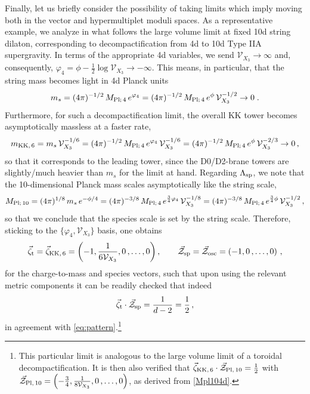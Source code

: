 Finally, let us briefly consider the possibility of taking limits which imply moving both in the vector and hypermultiplet moduli spaces. As a representative example, we analyze in what follows the large volume limit at fixed 10d string dilaton, corresponding to decompactification from 4d to 10d Type IIA supergravity. In terms of the appropriate 4d variables, we send $\mathcal{V}_{X_3}\to\infty$ and, consequently, $\varphi_4=\phi-\frac{1}{2}\log\mathcal{V}_{X_3} \to -\infty$. This means, in particular, that the string mass becomes light in 4d Planck units
%
\begin{equation}
	m_s = (4\pi)^{-1/2}\, M_{\rm Pl;\, 4}\, e^{\varphi_4} =  (4\pi)^{-1/2}\, M_{\rm Pl;\, 4}\, e^{\phi}\, \mathcal{V}_{X_3}^{-1/2}\to 0\;.
\end{equation}
%
Furthermore, for such a decompactification limit, the overall KK tower becomes asymptotically massless at a faster rate,
%
\begin{equation}
	m_{\rm KK,\, 6} = m_s\, \mathcal{V}_{X_3}^{-1/6}= (4\pi)^{-1/2}\, M_{\rm Pl;\, 4}\, e^{\varphi_4} \,\mathcal{V}_{X_3}^{-1/6} = (4\pi)^{-1/2}\, M_{\rm Pl;\, 4}\, e^{\phi}\, \mathcal{V}_{X_3}^{-2/3}\to 0\,,
\end{equation}
%
so that it corresponds to the leading tower, since the D0/D2-brane towers are slightly/much heavier than $m_{s}$ for the limit at hand. Regarding $\Lambda_{\text{sp}}$, we note that the 10-dimensional Planck mass scales asymptotically like the string scale,%
%
\begin{equation}
	M_{\rm Pl;\, 10} = (4\pi)^{1/8}\, m_s\, e^{-\phi/4} = (4\pi)^{-3/8}\, M_{\rm Pl;\, 4}\, e^{\frac{3}{4}\varphi_4}\, \mathcal{V}_{X_3}^{-1/8} = (4\pi)^{-3/8}\, M_{\rm Pl;\, 4}\, e^{\frac{3}{4}\phi}\, \mathcal{V}_{X_3}^{-1/2}\, ,
\label{Mpl104d}
\end{equation}
%
so that we conclude that the species scale is set by the string scale. Therefore, sticking to the $\{\varphi_4,\mathcal{V}_{X_3}\}$ basis, one obtains
%
\begin{equation}
	\vec{\zeta}_{\rm t}=\vec{\zeta}_{\rm KK,\, 6}=\left(-1,\frac{1}{6\mathcal{V}_{X_3}}, 0\, , \ldots, 0\right),\qquad \vec{\mathcal{Z}}_{\rm sp}=\vec{\mathcal{Z}}_{\rm osc}= \left(-1, 0\, , \ldots, 0\right)\, ,
\end{equation}
%
for the charge-to-mass and species vectors, such that upon using the relevant metric components it can be readily checked that indeed 
%
\begin{equation}
	\vec{\zeta}_{\rm t}\cdot \vec{\mathcal{Z}}_{\rm sp}=\frac{1}{d-2}=\frac{1}{2}\, ,
\end{equation}
%
in agreement with \eqref{eq:pattern}.\footnote{This particular limit is analogous to the large volume limit of a toroidal decompactification. It is then also verified that $\vec{\zeta}_{\rm KK,\, 6}\cdot \vec{\mathcal{Z}}_{\rm Pl,\, 10}=\frac12$ with $\vec{\mathcal{Z}}_{\rm Pl,\, 10}= \left(-\frac{3}{4},\frac{1}{8\mathcal{V}_{X_3}}, 0\, , \ldots, 0\right)$, as derived from \eqref{Mpl104d}.}
	

